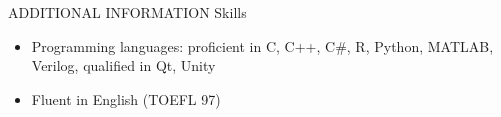 \documentclass{resume} %
\begin{document}
\begin{rSection}{ADDITIONAL INFORMATION}   
Skills
	\begin{itemize}
	\item Programming languages: proficient in C, C++, C\#, R, Python, MATLAB, Verilog, qualified in Qt, Unity
	\item Fluent in English (TOEFL 97)
	\end{itemize}
\end{rSection}

%
%
\end{document}
